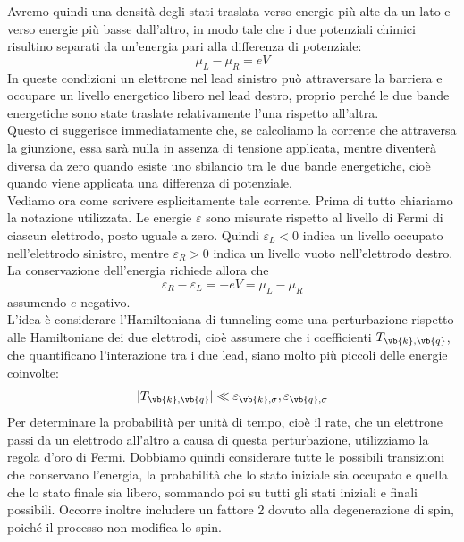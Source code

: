 \hspace{-0.6cm}Avremo quindi una densità degli stati traslata verso energie più alte da un lato e verso energie più basse dall'altro, in modo tale che i due potenziali chimici risultino separati da un'energia pari alla differenza di potenziale:
\begin{equation*}
    \mu_L - \mu_R = eV
\end{equation*}
In queste condizioni un elettrone nel lead sinistro può attraversare la barriera e occupare un livello energetico libero nel lead destro, proprio perché le due bande energetiche sono state traslate relativamente l'una rispetto all'altra.\\
Questo ci suggerisce immediatamente che, se calcoliamo la corrente che attraversa la giunzione, essa sarà nulla in assenza di tensione applicata, mentre diventerà diversa da zero quando esiste uno sbilancio tra le due bande energetiche, cioè quando viene applicata una differenza di potenziale.\\
Vediamo ora come scrivere esplicitamente tale corrente. Prima di tutto chiariamo la notazione utilizzata. Le energie $\varepsilon$ sono misurate rispetto al livello di Fermi di ciascun elettrodo, posto uguale a zero. Quindi $\varepsilon_L<0$ indica un livello occupato nell'elettrodo sinistro, mentre $\varepsilon_R>0$ indica un livello vuoto nell'elettrodo destro. La conservazione dell'energia richiede allora che
\begin{equation*}
    \varepsilon_R - \varepsilon_L
    =-eV
    =\mu_L - \mu_R
\end{equation*}
assumendo $e$ negativo.\\
L'idea è considerare l'Hamiltoniana di tunneling come una perturbazione rispetto alle Hamiltoniane dei due elettrodi, cioè assumere che i coefficienti $T_{\vb{k},\vb{q}}$, che quantificano l'interazione tra i due lead, siano molto più piccoli delle energie coinvolte:
\begin{equation*}
    |T_{\vb{k},\vb{q}}|
    \ll
    \varepsilon_{\vb{k},\sigma},
    \varepsilon_{\vb{q},\sigma}
\end{equation*}
Per determinare la probabilità per unità di tempo, cioè il rate, che un elettrone passi da un elettrodo all'altro a causa di questa perturbazione, utilizziamo la regola d'oro di Fermi. Dobbiamo quindi considerare tutte le possibili transizioni che conservano l'energia, la probabilità che lo stato iniziale sia occupato e quella che lo stato finale sia libero, sommando poi su tutti gli stati iniziali e finali possibili. Occorre inoltre includere un fattore 2 dovuto alla degenerazione di spin, poiché il processo non modifica lo spin.\\
